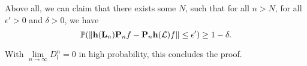 Above all, we can claim that there exists some $N$, such that for all $n>N$, for all $\epsilon'>0$ and $\delta>0$, we have
\begin{equation}
    \mathbb{P}(\|{\mathbf h}({\mathbf L}_n){\mathbf P}_n f - {\mathbf P}_n{\mathbf h}({\mathcal L}) f\|\leq \epsilon')\geq 1-\delta.
\end{equation}




With $\lim\limits_{n\rightarrow \infty}D_l^n=0$ in high probability, this concludes the proof. 
